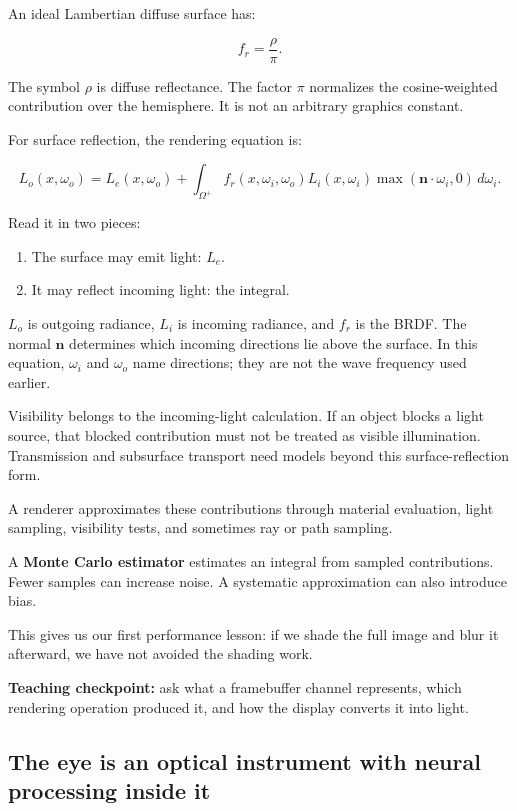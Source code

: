 An ideal Lambertian diffuse surface has:

\[
f_r=\frac{\rho}{\pi}.
\]

The symbol \(\rho\) is diffuse reflectance. The factor \(\pi\) normalizes the cosine-weighted contribution over the hemisphere. It is not an arbitrary graphics constant.

For surface reflection, the rendering equation is:

\[
L_o(x,\omega_o)=L_e(x,\omega_o)+
\int_{\Omega^+}
f_r(x,\omega_i,\omega_o)L_i(x,\omega_i)
\max(\mathbf n\cdot\omega_i,0)\,d\omega_i.
\]

Read it in two pieces:

\begin{enumerate}
\def\labelenumi{\arabic{enumi}.}
\tightlist
\item
  The surface may emit light: \(L_e\).
\item
  It may reflect incoming light: the integral.
\end{enumerate}

\(L_o\) is outgoing radiance, \(L_i\) is incoming radiance, and \(f_r\) is the BRDF. The normal \(\mathbf n\) determines which incoming directions lie above the surface. In this equation, \(\omega_i\) and \(\omega_o\) name directions; they are not the wave frequency used earlier.

Visibility belongs to the incoming-light calculation. If an object blocks a light source, that blocked contribution must not be treated as visible illumination. Transmission and subsurface transport need models beyond this surface-reflection form.

A renderer approximates these contributions through material evaluation, light sampling, visibility tests, and sometimes ray or path sampling.

A \textbf{Monte Carlo estimator} estimates an integral from sampled contributions. Fewer samples can increase noise. A systematic approximation can also introduce bias.

This gives us our first performance lesson: if we shade the full image and blur it afterward, we have not avoided the shading work.

\textbf{Teaching checkpoint:} ask what a framebuffer channel represents, which rendering operation produced it, and how the display converts it into light.

\subsection{The eye is an optical instrument with neural processing inside it}\label{04-visual-computing-ii-ch043-the-eye-is-an-optical-instrument-with-neural-processing-inside-it}

